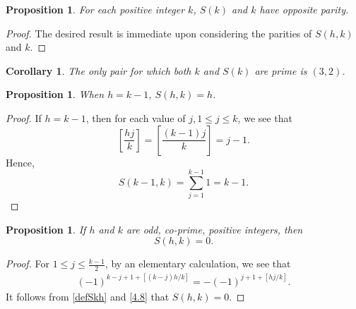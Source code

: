 \documentclass[11pt,reqno]{amsart}
\theoremstyle{plain}
\numberwithin{equation}{section}
\newtheorem{proposition}[theorem]{Proposition}
\newtheorem{corollary}[theorem]{Corollary}
\begin{document}
\begin{proposition}\label{parity} For each positive integer $k$,
    $S(k)$ and $k$ have opposite parity.
    \end{proposition}

\begin{proof}
The desired result is immediate upon considering the parities of $S(h,k)$ and $k$.


\end{proof}


\begin{corollary} The only pair for which both $k$ and $S(k)$ are prime is $(3,2)$.
\end{corollary}





\begin{proposition} When $h=k-1$, $S(h,k) = h$.
 \end{proposition}

\begin{proof}
If $h = k-1$, then for each value of $j, 1\leq j \leq k$, we see that $$\left[\frac{hj}{k}\right] = \left[\frac{(k-1)  j}{k}\right] = j-1.$$  Hence,
$$S(k-1,k)=\sum_{j=1}^{k-1}1=k-1.$$
\end{proof}


\begin{proposition}\label{4.7} If $h$ and $k$ are odd, co-prime, positive integers, then
\begin{equation*}
S(h,k)=0.
\end{equation*}
\end{proposition}

\begin{proof}
For $1\leq j \leq \frac{k-1}{2}$, by an elementary calculation, we see that
\begin{align}\label{4.8}
(-1)^{k-j+1+[(k-j)h/k]}
=-(-1)^{j+1+[hj/k]}.
\end{align}
It follows from \eqref{defSkh} and \eqref{4.8} that $S(h,k)=0$.
\end{proof}
\end{document}

